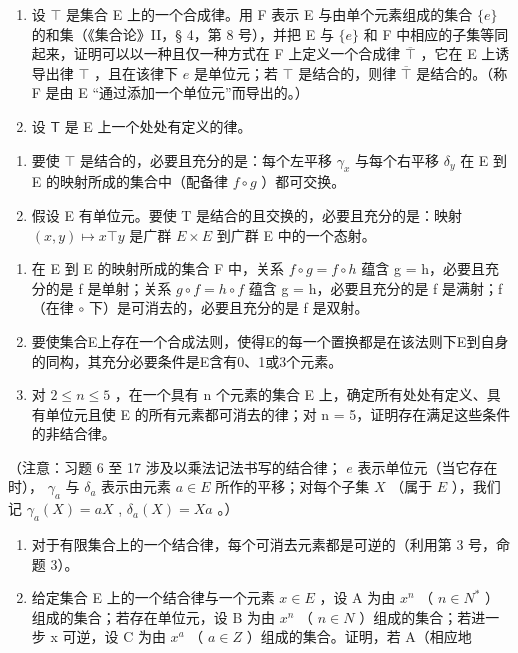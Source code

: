\BourbakiExercisesSection

\begin{enumerate}
\def\labelenumi{\arabic{enumi}.}
\item
  设 \(\top\) 是集合 E 上的一个合成律。用 F 表示 E 与由单个元素组成的集合 \(\{e\}\) 的和集（《集合论》II，§ 4，第 8 号），并把 E 与 \(\{e\}\) 和 F 中相应的子集等同起来，证明可以以一种且仅一种方式在 F 上定义一个合成律 \(\overline{\top}\) ，它在 E 上诱导出律 \(\top\) ，且在该律下 \(e\) 是单位元；若 \(\top\) 是结合的，则律 \(\overline{\top}\) 是结合的。（称 F 是由 E “通过添加一个单位元”而导出的。）
\item
  设 \(\mathsf{T}\) 是 E 上一个处处有定义的律。
\end{enumerate}

\begin{enumerate}
\def\labelenumi{(\alph{enumi})}
\item
  要使 \(\top\) 是结合的，必要且充分的是：每个左平移 \(\gamma_{x}\) 与每个右平移 \(\delta_{y}\) 在 E 到 E 的映射所成的集合中（配备律 \(f \circ g\) ）都可交换。
\item
  假设 E 有单位元。要使 T 是结合的且交换的，必要且充分的是：映射 \((x,y)\mapsto x\top y\) 是广群 \(E\times E\) 到广群 E 中的一个态射。
\end{enumerate}

\begin{enumerate}
\def\labelenumi{\arabic{enumi}.}
\setcounter{enumi}{2}
\item
  在 E 到 E 的映射所成的集合 F 中，关系 \(f \circ g = f \circ h\) 蕴含 g = h，必要且充分的是 f 是单射；关系 \(g \circ f = h \circ f\) 蕴含 g = h，必要且充分的是 f 是满射；f （在律 \(\circ\) 下）是可消去的，必要且充分的是 f 是双射。
\item
  要使集合E上存在一个合成法则，使得E的每一个置换都是在该法则下E到自身的同构，其充分必要条件是E含有0、1或3个元素。
\item
  对 \(2 \leqslant n \leqslant 5\) ，在一个具有 n 个元素的集合 E 上，确定所有处处有定义、具有单位元且使 E 的所有元素都可消去的律；对 n = 5，证明存在满足这些条件的非结合律。
\end{enumerate}

（注意：习题 6 至 17 涉及以乘法记法书写的结合律； \(e\) 表示单位元（当它存在时）， \(\gamma_a\) 与 \(\delta_a\) 表示由元素 \(a \in E\) 所作的平移；对每个子集 \(X\) （属于 \(E\) ），我们记 \(\gamma_a(X) = aX\) , \(\delta_a(X) = Xa\) 。）

\begin{enumerate}
\def\labelenumi{\arabic{enumi}.}
\setcounter{enumi}{5}
\item
  对于有限集合上的一个结合律，每个可消去元素都是可逆的（利用第 3 号，命题 3）。
\item
  给定集合 E 上的一个结合律与一个元素 \(x \in E\) ，设 A 为由 \(x^{n}\) （ \(n \in N^{*}\) ）组成的集合；若存在单位元，设 B 为由 \(x^{n}\) （ \(n \in N\) ）组成的集合；若进一步 x 可逆，设 C 为由 \(x^{a}\) （ \(a \in Z\) ）组成的集合。证明，若 A（相应地
\end{enumerate}

